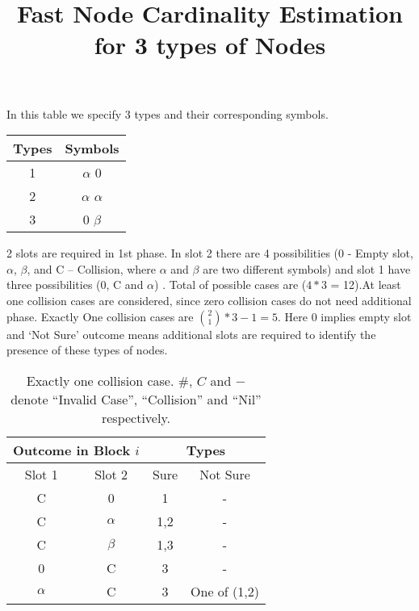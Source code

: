 \documentclass[fleqn]{article}
\begin{document}
\title{Fast Node Cardinality Estimation for 3 types of Nodes}

\maketitle{}

In this table we specify 3 types and their corresponding symbols. 
\begin{center}
  \begin{tabular}{| c | c |}
    \hline
    Types & Symbols \\ \hline
    1 & $\alpha$ $0$ \\ \hline
    2 & $\alpha$ $\alpha$ \\ \hline
    3 & $0$ $\beta$ \\ \hline
    
  \end{tabular}
\end{center}

2 slots are required in 1st phase. In slot 2 there are 4 possibilities (0 - Empty slot, $\alpha$, $\beta$, and C – Collision, where $\alpha$ and $\beta$ are two different symbols) and slot 1 have three possibilities (0, C and $\alpha$) . Total of possible cases are ($4*3$ = 12).At least one collision cases are considered, since zero collision cases do not need
additional phase.
Exactly One collision cases are $\binom{2}{1}*3 - 1 = 5$. 
Here 0 implies empty slot and `Not Sure' outcome means additional slots are
required to identify the presence of these types of nodes.

\begin {table} [h]
\centering
\begin{tabular}{|c|c|c|c|} 
\hline
\multicolumn{2}{|c|}{Outcome in Block $i$} & \multicolumn{2}{c|}{Types} \\ \hline
Slot 1               & Slot 2              & Sure    & Not Sure         \\ \hline
C                    & 0                   & 1        & -                \\ \hline
C                    & $\alpha$            & 1,2     & -                \\ \hline
C                    & $\beta$             & 1,3       & -   \\ \hline
0                    & C                   & 3       & -                \\ \hline
$\alpha$             & C                   & 3       & One of (1,2)     \\ \hline

\end{tabular}
\caption{Exactly one collision case. \#, $C$ and $-$ denote ``Invalid Case'', ``Collision'' and  ``Nil'' respectively.}
\label{Tab_OneC1}
\end{table}
\end{document}

